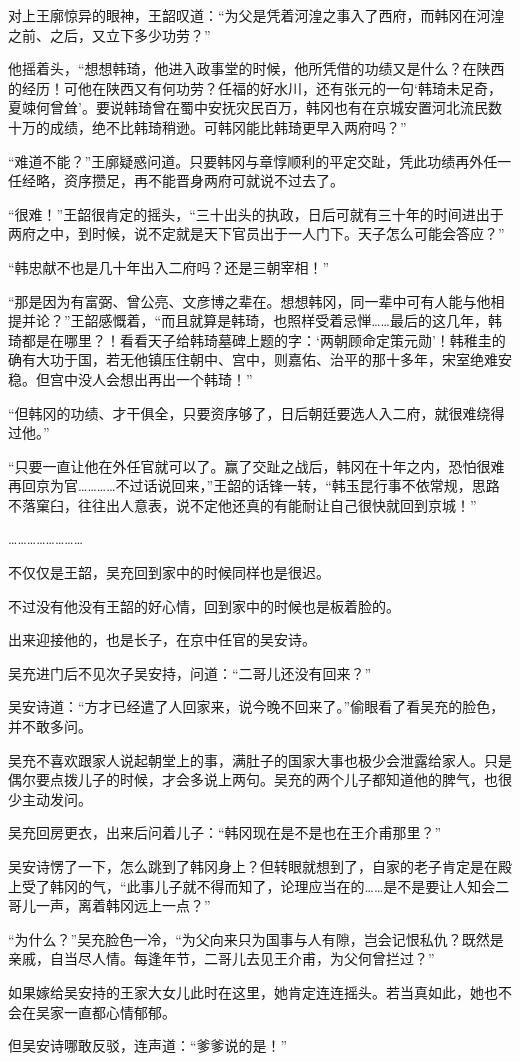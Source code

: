 对上王廓惊异的眼神，王韶叹道：“为父是凭着河湟之事入了西府，而韩冈在河湟之前、之后，又立下多少功劳？”

他摇着头，“想想韩琦，他进入政事堂的时候，他所凭借的功绩又是什么？在陕西的经历！可他在陕西又有何功劳？任福的好水川，还有张元的一句‘韩琦未足奇，夏竦何曾耸’。要说韩琦曾在蜀中安抚灾民百万，韩冈也有在京城安置河北流民数十万的成绩，绝不比韩琦稍逊。可韩冈能比韩琦更早入两府吗？”

“难道不能？”王廓疑惑问道。只要韩冈与章惇顺利的平定交趾，凭此功绩再外任一任经略，资序攒足，再不能晋身两府可就说不过去了。

“很难！”王韶很肯定的摇头，“三十出头的执政，日后可就有三十年的时间进出于两府之中，到时候，说不定就是天下官员出于一人门下。天子怎么可能会答应？”

“韩忠献不也是几十年出入二府吗？还是三朝宰相！”

“那是因为有富弼、曾公亮、文彦博之辈在。想想韩冈，同一辈中可有人能与他相提并论？”王韶感慨着，“而且就算是韩琦，也照样受着忌惮……最后的这几年，韩琦都是在哪里？！看看天子给韩琦墓碑上题的字：‘两朝顾命定策元勋’！韩稚圭的确有大功于国，若无他镇压住朝中、宫中，则嘉佑、治平的那十多年，宋室绝难安稳。但宫中没人会想出再出一个韩琦！”

“但韩冈的功绩、才干俱全，只要资序够了，日后朝廷要选人入二府，就很难绕得过他。”

“只要一直让他在外任官就可以了。赢了交趾之战后，韩冈在十年之内，恐怕很难再回京为官…………不过话说回来，”王韶的话锋一转，“韩玉昆行事不依常规，思路不落窠臼，往往出人意表，说不定他还真的有能耐让自己很快就回到京城！”

……………………

不仅仅是王韶，吴充回到家中的时候同样也是很迟。

不过没有他没有王韶的好心情，回到家中的时候也是板着脸的。

出来迎接他的，也是长子，在京中任官的吴安诗。

吴充进门后不见次子吴安持，问道：“二哥儿还没有回来？”

吴安诗道：“方才已经遣了人回家来，说今晚不回来了。”偷眼看了看吴充的脸色，并不敢多问。

吴充不喜欢跟家人说起朝堂上的事，满肚子的国家大事也极少会泄露给家人。只是偶尔要点拨儿子的时候，才会多说上两句。吴充的两个儿子都知道他的脾气，也很少主动发问。

吴充回房更衣，出来后问着儿子：“韩冈现在是不是也在王介甫那里？”

吴安诗愣了一下，怎么跳到了韩冈身上？但转眼就想到了，自家的老子肯定是在殿上受了韩冈的气，“此事儿子就不得而知了，论理应当在的……是不是要让人知会二哥儿一声，离着韩冈远上一点？”

“为什么？”吴充脸色一冷，“为父向来只为国事与人有隙，岂会记恨私仇？既然是亲戚，自当尽人情。每逢年节，二哥儿去见王介甫，为父何曾拦过？”

如果嫁给吴安持的王家大女儿此时在这里，她肯定连连摇头。若当真如此，她也不会在吴家一直都心情郁郁。

但吴安诗哪敢反驳，连声道：“爹爹说的是！”

